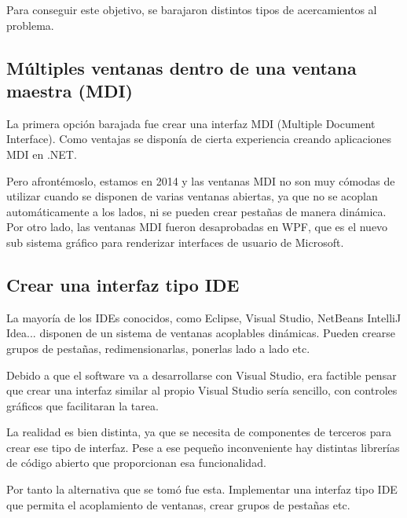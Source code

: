 Para conseguir este objetivo, se barajaron distintos tipos de acercamientos al problema.

\subsection{M\'ultiples ventanas dentro de una ventana maestra (MDI)}
La primera opci\'on barajada fue crear una interfaz MDI (Multiple Document Interface). Como ventajas se
dispon\'ia de cierta experiencia creando aplicaciones MDI en .NET.

Pero afront\'emoslo, estamos en 2014 y las ventanas MDI no son muy c\'omodas de utilizar cuando se disponen de varias ventanas
abiertas, ya que no se acoplan autom\'aticamente a los lados, ni se pueden crear pesta\~nas de manera din\'amica.
Por otro lado, las ventanas MDI fueron desaprobadas en WPF, que es el nuevo sub sistema gr\'afico para renderizar 
interfaces de usuario de Microsoft.

\subsection{Crear una interfaz tipo IDE}
La mayor\'ia de los IDEs conocidos, como Eclipse, Visual Studio, NetBeans IntelliJ Idea... disponen de un sistema de 
ventanas acoplables din\'amicas. Pueden crearse grupos de pesta\~nas, redimensionarlas, ponerlas lado a lado etc.

Debido a que el software va a desarrollarse con Visual Studio, era factible pensar que crear una interfaz similar al propio
Visual Studio ser\'ia sencillo, con controles gr\'aficos que facilitaran la tarea.

La realidad es bien distinta, ya que se necesita de componentes de terceros para crear ese tipo de interfaz. Pese a ese
peque\~no inconveniente hay distintas librer\'ias de c\'odigo abierto que proporcionan esa funcionalidad.

Por tanto la alternativa que se tom\'o fue esta. Implementar una interfaz tipo IDE que permita el acoplamiento de ventanas,
crear grupos de pesta\~nas etc.